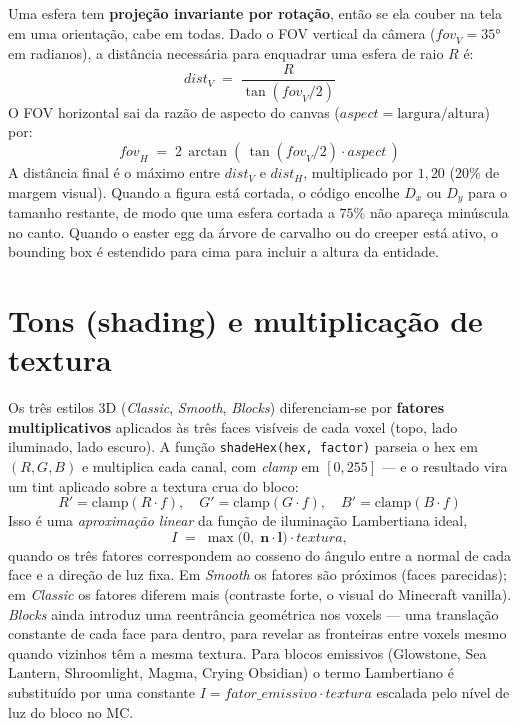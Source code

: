 \documentclass[12pt,a4paper]{scrartcl}
\newcommand{\code}[1]{\texttt{\small #1}}
\newcommand{\acc}[1]{\textcolor{accent}{\textbf{#1}}}
\begin{document}
Uma esfera tem \acc{projeção invariante por rotação}, então se ela couber na tela em uma orientação, cabe em todas. Dado o FOV vertical da câmera ($\mathit{fov}_V = 35°$ em radianos), a distância necessária para enquadrar uma esfera de raio $R$ é:
\[
\mathit{dist}_V \;=\; \dfrac{R}{\tan(\mathit{fov}_V / 2)}
\]
O FOV horizontal sai da razão de aspecto do canvas ($\mathit{aspect} = \text{largura}/\text{altura}$) por:
\[
\mathit{fov}_H \;=\; 2\,\arctan\!\left(\,\tan(\mathit{fov}_V/2)\cdot \mathit{aspect}\,\right)
\]
A distância final é o máximo entre $\mathit{dist}_V$ e $\mathit{dist}_H$, multiplicado por $1{,}20$ ($20\%$ de margem visual). Quando a figura está cortada, o código encolhe $D_x$ ou $D_y$ para o tamanho restante, de modo que uma esfera cortada a $75\%$ não apareça minúscula no canto. Quando o easter egg da árvore de carvalho ou do creeper está ativo, o bounding box é estendido para cima para incluir a altura da entidade.

\section{Tons (shading) e multiplicação de textura}

Os três estilos 3D (\emph{Classic}, \emph{Smooth}, \emph{Blocks}) diferenciam-se por \acc{fatores multiplicativos} aplicados às três faces visíveis de cada voxel (topo, lado iluminado, lado escuro). A função \code{shadeHex(hex, factor)} parseia o hex em $(R,G,B)$ e multiplica cada canal, com \emph{clamp} em $[0, 255]$ --- e o resultado vira um tint aplicado sobre a textura crua do bloco:
\[
R' = \mathrm{clamp}(R \cdot f),\quad
G' = \mathrm{clamp}(G \cdot f),\quad
B' = \mathrm{clamp}(B \cdot f)
\]
Isso é uma \emph{aproximação linear} da função de iluminação Lambertiana ideal,
\[
I \;=\; \max\bigl(0,\;\mathbf{n}\cdot\mathbf{l}\bigr)\cdot \mathit{textura},
\]
quando os três fatores correspondem ao cosseno do ângulo entre a normal de cada face e a direção de luz fixa. Em \emph{Smooth} os fatores são próximos (faces parecidas); em \emph{Classic} os fatores diferem mais (contraste forte, o visual do Minecraft vanilla). \emph{Blocks} ainda introduz uma reentrância geométrica nos voxels --- uma translação constante de cada face para dentro, para revelar as fronteiras entre voxels mesmo quando vizinhos têm a mesma textura. Para blocos emissivos (Glowstone, Sea Lantern, Shroomlight, Magma, Crying Obsidian) o termo Lambertiano é substituído por uma constante $I = \mathit{fator\_emissivo} \cdot \mathit{textura}$ escalada pelo nível de luz do bloco no MC.
\end{document}
